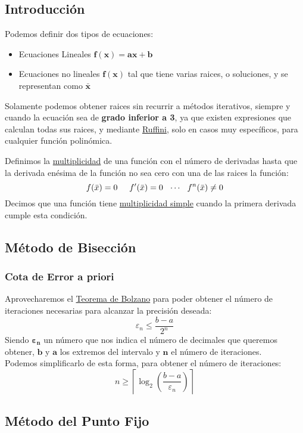 \subsection{Introducción}
\noindent Podemos definir dos tipos de ecuaciones:
\begin{itemize}
        \item Ecuaciones Lineales \(\mathbf{f(x) = ax +b}\)
        \item Ecuaciones no lineales \(\mathbf{f(x)}\) tal que tiene varias raices, o soluciones, y se representan como \(\mathbf{\bar{x}}\)
\end{itemize}
\noindent Solamente podemos obtener raices sin recurrir a métodos iterativos, siempre y cuando la ecuación sea de \textbf{grado inferior a 3}, ya que existen expresiones que calculan todas sus raices, y mediante \underline{Ruffini}, solo en casos muy específicos, para cualquier función polinómica.
\par
\vspace{.5cm}
\noindent Definimos la \underline{multiplicidad} de una función con el número de derivadas hasta que la derivada enésima de la función no sea cero con una de las raices la función:
\[
        f(\bar{x}) = 0 \hspace{5mm}f'(\bar{x}) = 0 \hspace{2.5mm} \cdots \hspace{2.5mm} f^n(\bar{x}) \not = 0
\]
Decimos que una función tiene \underline{multiplicidad simple} cuando la primera derivada cumple esta condición.
\subsection{Método de Bisección}
\subsubsection{Cota de Error a priori}
\noindent Aprovecharemos el \underline{Teorema de Bolzano} para poder obtener el número de iteraciones necesarias para alcanzar la precisión deseada:
\[
        \boxed{\varepsilon_n \leq \frac{b-a}{2^n}}
\]
\noindent Siendo \(\mathbf{\varepsilon_n}\) un número que nos indica el número de decimales que queremos obtener, \(\mathbf{b}\) y \(\mathbf{a}\) los extremos del intervalo y \(\mathbf{n}\) el número de iteraciones.\\ Podemos simplificarlo de esta forma, para obtener el número de iteraciones:
\[
        \boxed{n\geq \left \lceil \log_2{\left ( \frac{b-a}{\varepsilon_n} \right )} \right \rceil}
\]
\subsection{Método del Punto Fijo}
